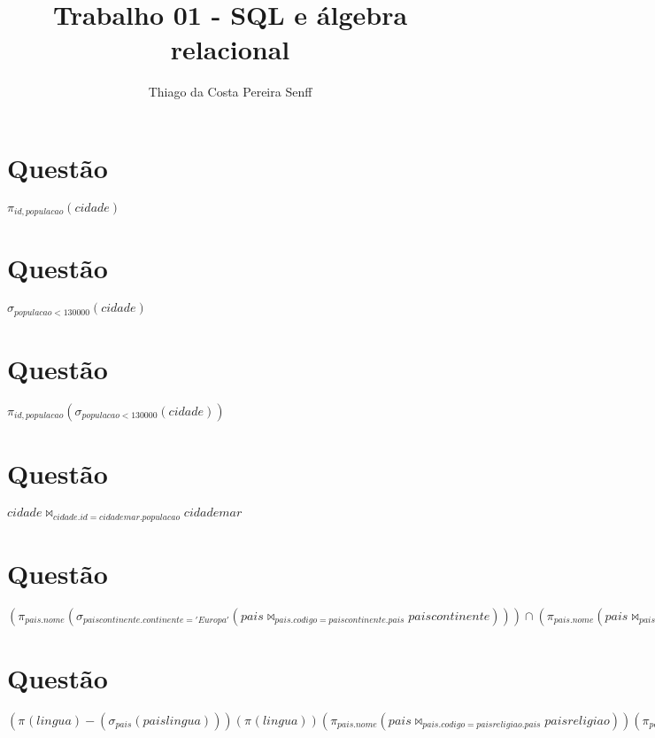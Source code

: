 \documentclass[a4paper, 11pt]{article}
\author{Thiago da Costa Pereira Senff}
\title{Trabalho 01 - SQL e álgebra relacional }
\begin{document}
    \maketitle
    \tableofcontents

    \section{Questão}
        $ \pi_{id, populacao}(cidade) $

    \section{Questão}
        $ \sigma_{populacao<130000}(cidade) $

    \section{Questão}
        $ \pi_{id, populacao}(\sigma_{populacao<130000}(cidade)) $

    \section{Questão}
        $ cidade \bowtie_{cidade.id = cidademar.populacao} cidademar $

    \section{Questão}
        $ 
            (\pi_{pais.nome}( \sigma_{paiscontinente.continente='Europa'}(pais\bowtie_{pais.codigo=paiscontinente.pais} paiscontinente) ) )
            \cap 
            (\pi_{pais.nome}(pais \bowtie_{pais.codigo=paisreligiao.pais} paisreligiao))  
        $
        
    \section{Questão}
        $
            (\pi_{}(lingua) - ( \sigma_{pais}(paislingua)  ) )  
            (\pi_{}(lingua))  
            (\pi_{pais.nome}(pais \bowtie_{pais.codigo=paisreligiao.pais} paisreligiao))  
            (\pi_{pais.nome}(pais \bowtie_{pais.codigo=paisreligiao.pais} paisreligiao))  
        $
\end{document}
